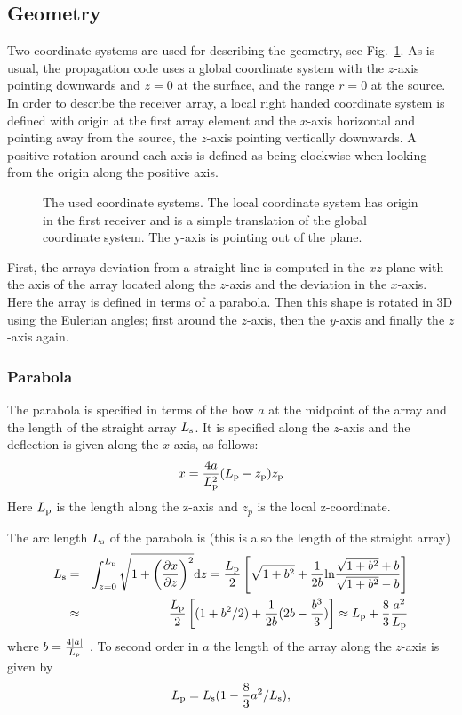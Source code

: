 \documentclass{saclantc}
\begin{document}
\subsection{Geometry}
Two coordinate systems are used for describing the geometry, see Fig.\
\ref{covertcoord}. As is
usual, the propagation code uses a global coordinate system with the $z$-axis
pointing downwards and $z=0$ at the surface, and the range $r=0$ at the
source.
%
In order to describe the receiver array,
a local right handed coordinate system is defined with origin at the first
array element and the $x$-axis horizontal and pointing away from the source,
the  $z$-axis pointing vertically downwards.
%
A positive rotation around each axis is defined as being
clockwise when looking from  the origin along the positive axis.
   \begin{figure}
      \epsfxsize=10cm \centerline{}
      \caption{The used coordinate systems. The local coordinate
system has origin in the first receiver and is a simple translation of
the global coordinate system. The y-axis is pointing out of the plane.}  
\label{covertcoord}  
\end{figure}

First, the arrays deviation from a straight line is computed 
in the $xz$-plane with the axis of the array located along the
$z$-axis and the deviation in the $x$-axis. 
Here the array is defined in terms of a parabola.
Then this shape is rotated in 3D using the Eulerian angles\cite{marrion}; 
first around the $z$-axis, then
the $y$-axis and finally the $z$-axis again.

 

\subsubsection{Parabola}

The parabola is specified in terms of the bow  $a$ at the midpoint of the array and the length of the straight
array $L_{\rm s}$.
It is specified along the $z$-axis and the deflection is given along the
$x$-axis, as follows:
\begin{equation}
x= \frac{4 a}{L_{\rm p}^2}(L_{\rm p}-z_{\rm p})z_{\rm p}
\label{eq:parab}
\end{equation}
Here $L_{\rm p}$ is the length along the z-axis and $z_p$ is the local
z-coordinate.

The arc length $L_{\rm s}$ of the
parabola is (this is also the length of the straight array)
\begin{eqnarray}
L_{\rm s} &=& \int_{z=0}^{L_{\rm p}} \sqrt{ 1+\left( \frac{\partial
 x}{\partial z}\right)^2} {\rm d} z=
 \frac{L_{\rm p}}{2}\left[\sqrt{1+b^2}+
 \frac{1}{2b}{\rm ln} \frac{\sqrt{1+b^2}+b}{\sqrt{1+b^2}-b}\right]
\nonumber \\ 
&\approx&  \frac{L_{\rm p}}{2}\left[ (1+b^2/2) +
 \frac{1}{2b}(2b-\frac{b^3}{3})\right]
\approx L_{\rm p}+\frac{8}{3}\frac{a^2}{L_{\rm p}}
\end{eqnarray}
where $b=\frac{4 |a|}{L_{\rm p}}$ .
To second order in $a$ the length of the array along the $z$-axis is given by
\begin{equation}
L_{\rm p}= L_{\rm s} ( 1-\frac{8}{3} a^2/L_{\rm s}),
\end{equation}
\end{document}
